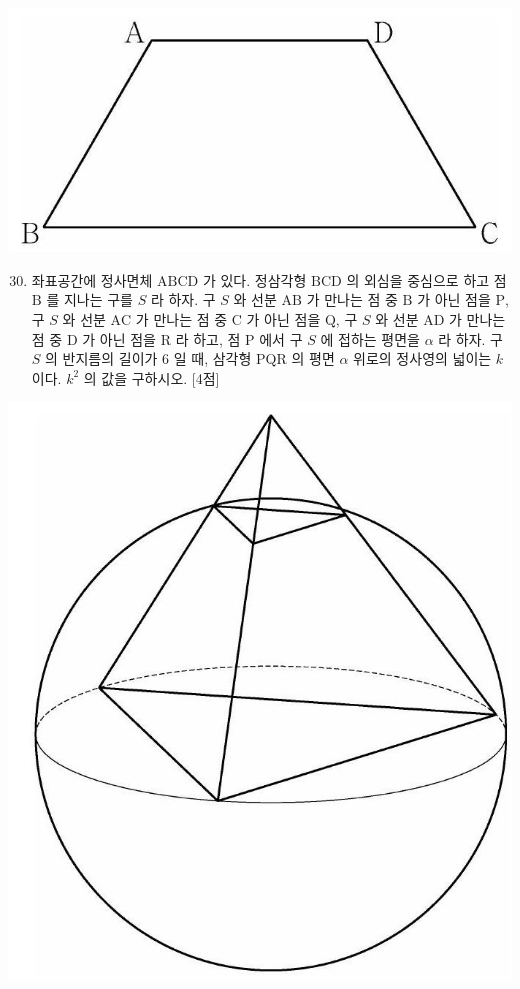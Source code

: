 \documentclass[10pt]{article}
\begin{document}
\begin{center}
\includegraphics[max width=\textwidth]{2023_05_19_a9cef858603f6abf5411g-40}
\end{center}

\begin{enumerate}
  \setcounter{enumi}{29}
  \item 좌표공간에 정사면체 $\mathrm{ABCD}$ 가 있다. 정삼각형 $\mathrm{BCD}$ 의 외심을 중심으로 하고 점 $\mathrm{B}$ 를 지나는 구를 $S$ 라 하자. 구 $S$ 와 선분 $\mathrm{AB}$ 가 만나는 점 중 $\mathrm{B}$ 가 아닌 점을 $\mathrm{P}$, 구 $S$ 와 선분 $\mathrm{AC}$ 가 만나는 점 중 $\mathrm{C}$ 가 아닌 점을 $\mathrm{Q}$, 구 $S$ 와 선분 $\mathrm{AD}$ 가 만나는 점 중 $\mathrm{D}$ 가 아닌 점을 $\mathrm{R}$ 라 하고, 점 $\mathrm{P}$ 에서 구 $S$ 에 접하는 평면을 $\alpha$ 라 하자. 구 $S$ 의 반지름의 길이가 6 일 때, 삼각형 $\mathrm{PQR}$ 의 평면 $\alpha$ 위로의 정사영의 넓이는 $k$ 이다. $k^{2}$ 의 값을 구하시오. [4점]
\end{enumerate}

\begin{center}
\includegraphics[max width=\textwidth]{2023_05_19_a9cef858603f6abf5411g-40(1)}
\end{center}
\end{document}
